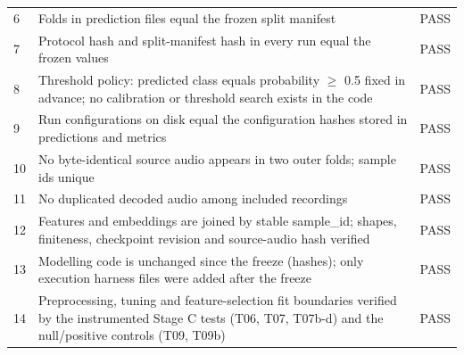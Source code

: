 \documentclass[11pt,a4paper]{article}
\begin{document}
\begin{center}
\begin{longtable}{>{\raggedleft\arraybackslash}p{1.55cm}>{\raggedright\arraybackslash}p{12.14cm}>{\raggedright\arraybackslash}p{1.55cm}}
\hspace{0pt}6 & \hspace{0pt}Folds in prediction files equal the frozen split manifest & \hspace{0pt}PASS\\
\hspace{0pt}7 & \hspace{0pt}Protocol hash and split-manifest hash in every run equal the frozen values & \hspace{0pt}PASS\\
\hspace{0pt}8 & \hspace{0pt}Threshold policy: predicted class equals probability $\geq$ 0.5 fixed in advance; no calibration or threshold search exists in the code & \hspace{0pt}PASS\\
\hspace{0pt}9 & \hspace{0pt}Run configurations on disk equal the configuration hashes stored in predictions and metrics & \hspace{0pt}PASS\\
\hspace{0pt}10 & \hspace{0pt}No byte-identical source audio appears in two outer folds; sample ids unique & \hspace{0pt}PASS\\
\hspace{0pt}11 & \hspace{0pt}No duplicated decoded audio among included recordings & \hspace{0pt}PASS\\
\hspace{0pt}12 & \hspace{0pt}Features and embeddings are joined by stable sample\_\allowbreak{}id; shapes, finiteness, checkpoint revision and source-audio hash verified & \hspace{0pt}PASS\\
\hspace{0pt}13 & \hspace{0pt}Modelling code is unchanged since the freeze (hashes); only execution harness files were added after the freeze & \hspace{0pt}PASS\\
\hspace{0pt}14 & \hspace{0pt}Preprocessing, tuning and feature-selection fit boundaries verified by the instrumented Stage C tests (T06, T07, T07b-d) and the null/\allowbreak{}positive controls (T09, T09b) & \hspace{0pt}PASS\\

\end{longtable}
\end{center}
\end{document}
